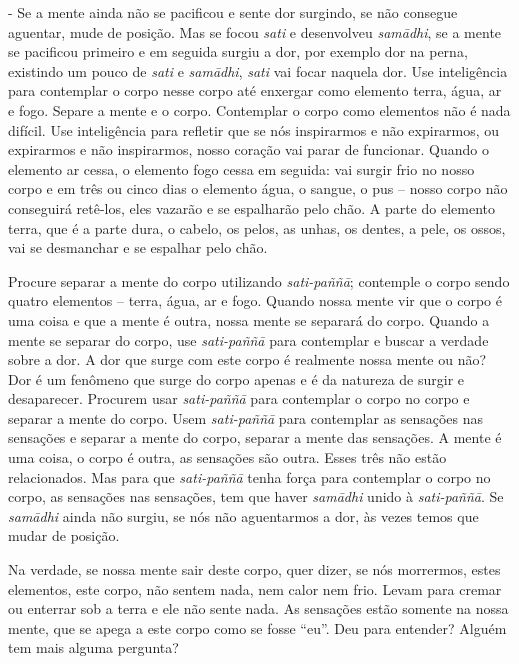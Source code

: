 - Se a mente ainda não se pacificou e sente dor surgindo, se não
consegue aguentar, mude de posição. Mas se focou \textit{sati }e
desenvolveu \textit{sam\=adhi}, se a mente se pacificou primeiro e em
seguida surgiu a dor, por exemplo dor na perna, existindo um pouco de
\textit{sati }e \textit{sam\=adhi}, \textit{sati }vai focar naquela
dor. Use inteligência para contemplar o corpo nesse corpo até enxergar
como elemento terra, água, ar e fogo. Separe a mente e o corpo.
Contemplar o corpo como elementos não é nada difícil. Use inteligência
para refletir que se nós inspirarmos e não expirarmos, ou expirarmos e
não inspirarmos, nosso coração vai parar de funcionar. Quando o
elemento ar cessa, o elemento fogo cessa em seguida: vai surgir frio no
nosso corpo e em três ou cinco dias o elemento água, o sangue, o pus –
nosso corpo não conseguirá retê-los, eles vazarão e se espalharão pelo
chão. A parte do elemento terra, que é a parte dura, o cabelo, os
pelos, as unhas, os dentes, a pele, os ossos, vai se desmanchar e se
espalhar pelo chão.

Procure separar a mente do corpo utilizando \textit{sati-paññ\=a};
contemple o corpo sendo quatro elementos – terra, água, ar e fogo.
Quando nossa mente vir que o corpo é uma coisa e que a mente é outra,
nossa mente se separará do corpo. Quando a mente se separar do corpo,
use \textit{sati-paññ\=a }para contemplar e buscar a verdade sobre a
dor. A dor que surge com este corpo é realmente nossa mente ou não? Dor
é um fenômeno que surge do corpo apenas e é da natureza de surgir e
desaparecer. Procurem usar \textit{sati-paññ\=a }para contemplar o
corpo no corpo e separar a mente do corpo. Usem \textit{sati-paññ\=a
}para contemplar as sensações nas sensações e separar a mente do corpo,
separar a mente das sensações. A mente é uma coisa, o corpo é outra, as
sensações são outra. Esses três não estão relacionados. Mas para que
\textit{sati-paññ\=a }tenha força para contemplar o corpo no corpo, as
sensações nas sensações, tem que haver \textit{sam\=adhi }unido à
\textit{sati-paññ\=a}. Se \textit{sam\=adhi }ainda não surgiu, se nós
não aguentarmos a dor, às vezes temos que mudar de posição.

Na verdade, se nossa mente sair deste corpo, quer dizer, se nós
morrermos, estes elementos, este corpo, não sentem nada, nem calor nem
frio. Levam para cremar ou enterrar sob a terra e ele não sente nada.
As sensações estão somente na nossa mente, que se apega a este corpo
como se fosse “eu”. Deu para entender? Alguém tem mais alguma pergunta?

